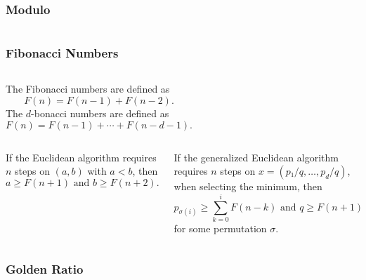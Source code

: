 \documentclass[aspectratio=169]{beamer}
\begin{document}
\begin{frame}[fragile]
  \frametitle{Modulo}
  \begin{columns}
    

  \end{columns}
\end{frame}

\begin{frame}
  \frametitle{Fibonacci Numbers}
  \small
  \begin{columns}[T]
    The Fibonacci numbers are defined as
    \[
      F(n) = F(n - 1) + F(n - 2).
    \]
    The $d$-bonacci numbers are defined as
    \[
      F(n) = F(n - 1) + ⋯ + F(n - d - 1).
    \]
  \end{columns}
  \vspace{1em}
  \begin{columns}[T]
    \begin{theorem}
      If the Euclidean algorithm requires $n$ steps on $(a, b)$ with $a < b$,
      then \[
        a ≥ F(n+1) \text{ and } b ≥ F(n+2).
      \]
    \end{theorem}

    \begin{theorem}
      If the generalized Euclidean algorithm requires $n$ steps on $x = (p₁/q, …, p_d/q)$,
      when selecting the minimum,
      then \[
        p_{σ(i)} ≥ ∑_{k=0}^i F(n-k) \text{ and } q ≥ F(n+1)
      \]
      for some permutation $σ$.
    \end{theorem}
  \end{columns}
\end{frame}

\begin{frame}
  \frametitle{Golden Ratio}

  \begin{columns}

  \end{columns}
\end{frame}
\end{document}
